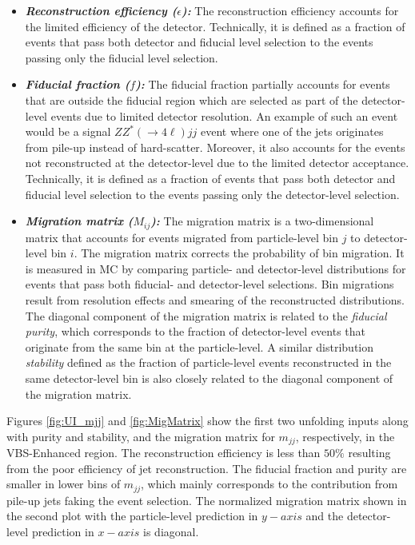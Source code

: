 \begin{itemize}
    \item{\textit{\textbf{Reconstruction efficiency ($\epsilon$):}} The reconstruction efficiency accounts for the limited efficiency of the detector. Technically, it is defined as a fraction of events that pass both detector and fiducial level selection to the events passing only the fiducial level selection. }
    
    \item{\textit{\textbf{Fiducial fraction ($f$):}} The fiducial fraction partially accounts for events that are outside the fiducial region which are selected as part of the detector-level events due to limited detector resolution. An example of such an event would be a signal $ZZ^*(\rightarrow 4\ell) jj$ event where one of the jets originates from pile-up instead of hard-scatter. Moreover, it also accounts for the events not reconstructed at the detector-level due to the limited detector acceptance. Technically, it is defined as a fraction of events that pass both detector and fiducial level selection to the events passing only the detector-level selection. }
    
    \item{\textit{\textbf{Migration matrix ($M_{ij}$):}} The migration matrix is a two-dimensional matrix that accounts for events migrated from particle-level bin $j$ to detector-level bin $i$. The migration matrix corrects the probability of bin migration. It is measured in MC by comparing particle- and detector-level distributions for events that pass both fiducial- and detector-level selections. Bin migrations result from resolution effects and smearing of the reconstructed distributions. The diagonal component of the migration matrix is related to the \textit{fiducial purity}, which corresponds to the fraction of detector-level events that originate from the same bin at the particle-level. A similar distribution \textit{stability} defined as the fraction of particle-level events reconstructed in the same detector-level bin is also closely related to the diagonal component of the migration matrix. }
\end{itemize}

Figures \ref{fig:UI_mjj} and \ref{fig:MigMatrix} show the first two unfolding inputs along with purity and stability, and the migration matrix for $m_{jj}$, respectively, in the VBS-Enhanced region. The reconstruction efficiency is less than $50\%$ resulting from the poor efficiency of jet reconstruction. The fiducial fraction and purity are smaller in lower bins of $m_{jj}$, which mainly corresponds to the contribution from pile-up jets faking the event selection. The normalized migration matrix shown in the second plot with the particle-level prediction in $y-axis$ and the detector-level prediction in $x-axis$ is diagonal.

